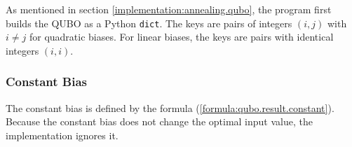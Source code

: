 As mentioned in section \ref{implementation:annealing.qubo}, the program first builds the QUBO as a Python \texttt{dict}.
The keys are pairs of integers $(i, j)$ with $i \neq j$ for quadratic biases.
For linear biases, the keys are pairs with identical integers $(i, i)$.

\subsubsection{Constant Bias}
\label{implementation:annealing.qubo.constant}

The constant bias is defined by the formula (\ref{formula:qubo.result.constant}).
Because the constant bias does not change the optimal input value, the implementation ignores it.
